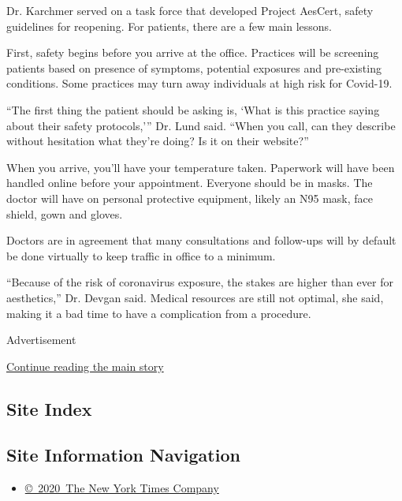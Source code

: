 Dr. Karchmer served on a task force that developed Project AesCert,
safety guidelines for reopening. For patients, there are a few main
lessons.

First, safety begins before you arrive at the office. Practices will be
screening patients based on presence of symptoms, potential exposures
and pre-existing conditions. Some practices may turn away individuals at
high risk for Covid-19.

``The first thing the patient should be asking is, `What is this
practice saying about their safety protocols,''' Dr. Lund said. ``When
you call, can they describe without hesitation what they're doing? Is it
on their website?''

When you arrive, you'll have your temperature taken. Paperwork will have
been handled online before your appointment. Everyone should be in
masks. The doctor will have on personal protective equipment, likely an
N95 mask, face shield, gown and gloves.

Doctors are in agreement that many consultations and follow-ups will by
default be done virtually to keep traffic in office to a minimum.

``Because of the risk of coronavirus exposure, the stakes are higher
than ever for aesthetics,'' Dr. Devgan said. Medical resources are still
not optimal, she said, making it a bad time to have a complication from
a procedure.

Advertisement

\protect\hyperlink{after-bottom}{Continue reading the main story}

\hypertarget{site-index}{%
\subsection{Site Index}\label{site-index}}

\hypertarget{site-information-navigation}{%
\subsection{Site Information
Navigation}\label{site-information-navigation}}

\begin{itemize}
\tightlist
\item
  \href{https://help.nytimes3xbfgragh.onion/hc/en-us/articles/115014792127-Copyright-notice}{©~2020~The
  New York Times Company}
\end{itemize}

